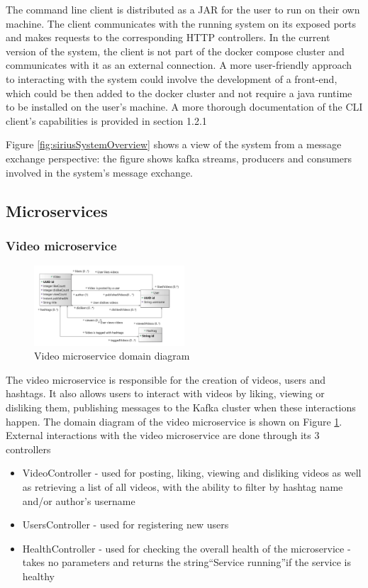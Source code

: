 \documentclass[parskip=full]{article}
\begin{document}
    The command line client is distributed as a JAR for the user to run on their own machine.
    The client communicates with the running system on its exposed ports and makes requests to the corresponding HTTP controllers.
    In the current version of the system, the client is not part of the docker compose cluster and communicates with it as an external connection.
    A more user-friendly approach to interacting with the system could involve the development of a front-end, which could be then added to the docker cluster and not require a java runtime to be installed on the user's machine.
    A more thorough documentation of the CLI client's capabilities is provided in section 1.2.1

    Figure \ref{fig:siriusSystemOverview} shows a view of the system from a message exchange perspective: the figure shows kafka streams, producers and consumers involved in the system's message exchange.

    \pagebreak
    \subsection{Microservices}
    \subsubsection{Video microservice}

    \begin{figure}
        \includegraphics[width=0.5\textwidth]{vm-domain-diagram}
        \caption{Video microservice domain diagram}
        \label{fig:vmDomain}
    \end{figure}
    The video microservice is responsible for the creation of videos, users and hashtags.
    It also allows users to interact with videos by liking, viewing or disliking them, publishing messages to the Kafka cluster when these interactions happen.
    The domain diagram of the video microservice is shown on Figure \ref{fig:vmDomain}.
    External interactions with the video microservice are done through its 3 controllers

    \begin{itemize}
        \item VideoController - used for posting, liking, viewing and disliking videos as well as retrieving a list of all videos, with the ability to filter by hashtag name and/or author's username
        \item UsersController - used for registering new users
        \item HealthController - used for checking the overall health of the microservice - takes no parameters and returns the string``Service running''if the service is healthy
    \end{itemize}
\end{document}
